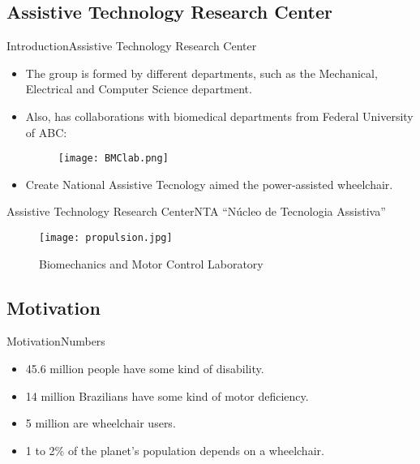 \documentclass[10pt]{beamer}
\begin{document}
\subsection{Assistive Technology Research Center}
\begin{frame}{Introduction}{Assistive Technology Research Center}
\begin{itemize}
	\item The group is formed by different departments, such as the Mechanical, Electrical and Computer Science department. 
	\item Also, has collaborations with biomedical departments from Federal University of ABC:
	\begin{figure}
		\texttt{[image: BMClab.png]}
	\end{figure}
	\item Create National Assistive Tecnology aimed the power-assisted wheelchair. 
\end{itemize}
\end{frame}

\begin{frame}{Assistive Technology Research Center}{NTA “Núcleo de Tecnologia Assistiva”}
\begin{figure}
\centering
\texttt{[image: propulsion.jpg]}
\caption{Biomechanics and Motor Control Laboratory}
\end{figure}
\end{frame}

\subsection{Motivation}
\begin{frame}{Motivation}{Numbers}
\begin{itemize}
	\item 45.6 million people have some kind of disability.
	\item 14 million Brazilians have some kind of motor deficiency.
	\item 5 million are wheelchair users.
	\item 1 to 2\% of the planet's population depends on a wheelchair.
\end{itemize}
\end{frame}
\end{document}

